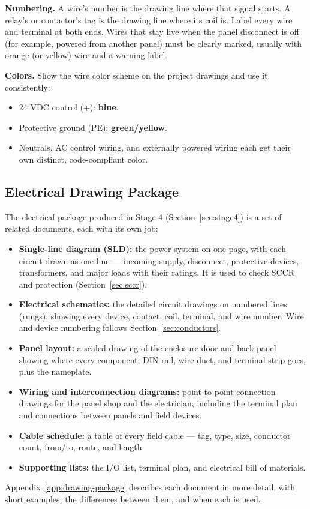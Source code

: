 \textbf{Numbering.} A wire's number is the drawing line where that signal starts. A relay's or contactor's tag is the drawing line where its coil is. Label every wire and terminal at both ends. Wires that stay live when the panel disconnect is off (for example, powered from another panel) must be clearly marked, usually with orange (or yellow) wire and a warning label.

\textbf{Colors.} Show the wire color scheme on the project drawings and use it consistently:
\begin{itemize}[itemsep=1pt]
  \item 24 VDC control (+): \textbf{blue}.
  \item Protective ground (PE): \textbf{green/yellow}.
  \item Neutrals, AC control wiring, and externally powered wiring each get their own distinct, code-compliant color.
\end{itemize}

\subsection{Electrical Drawing Package}\label{sec:drawing-package}
The electrical package produced in Stage 4 (Section~\ref{sec:stage4}) is a set of related documents, each with its own job:
\begin{itemize}[itemsep=2pt]
  \item \textbf{Single-line diagram (SLD):} the power system on one page, with each circuit drawn as one line --- incoming supply, disconnect, protective devices, transformers, and major loads with their ratings. It is used to check SCCR and protection (Section~\ref{sec:sccr}).
  \item \textbf{Electrical schematics:} the detailed circuit drawings on numbered lines (rungs), showing every device, contact, coil, terminal, and wire number. Wire and device numbering follows Section~\ref{sec:conductors}.
  \item \textbf{Panel layout:} a scaled drawing of the enclosure door and back panel showing where every component, DIN rail, wire duct, and terminal strip goes, plus the nameplate.
  \item \textbf{Wiring and interconnection diagrams:} point-to-point connection drawings for the panel shop and the electrician, including the terminal plan and connections between panels and field devices.
  \item \textbf{Cable schedule:} a table of every field cable --- tag, type, size, conductor count, from/to, route, and length.
  \item \textbf{Supporting lists:} the I/O list, terminal plan, and electrical bill of materials.
\end{itemize}
Appendix~\ref{app:drawing-package} describes each document in more detail, with short examples, the differences between them, and when each is used.


